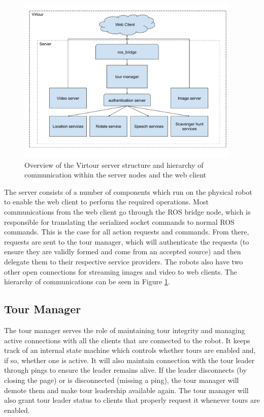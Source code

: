 \documentclass[
  oneside,
  11pt, a4paper,
  footinclude=true,
  headinclude=true,
  cleardoublepage=empty
]{article}
\begin{document}
\begin{figure}
  \centering
  \includegraphics[width=0.95\textwidth]{virtour_server}
  \caption{Overview of the Virtour server structure and hierarchy of
  communication within the server nodes and the web client}
  \label{fig:server}
\end{figure}

The server consists of a number of components which run on the physical robot
to enable the web client to perform the required operations. Most communications
from the web client go through the ROS bridge node, which is responsible
for translating the serialized socket commands to normal ROS commands. This is
the case for all action requests and commands. From there, requests are
sent to the tour manager, which will authenticate the requests (to ensure they
are validly formed and come from an accepted source) and then delegate them to
their respective service providers. The robots also have two other open
connections for streaming images and video to web clients. The hierarchy of
communications can be seen in Figure \ref{fig:server}.

\subsection{Tour Manager}

The tour manager serves the role of maintaining tour integrity and managing
active connections with all the clients that are connected to the robot. It
keeps track of an internal state machine which controls whether tours are
enabled and, if so, whether one is active. It will also maintain connection
with the tour leader through pings to ensure the leader remains alive. If the
leader disconnects (by closing the page) or is disconnected (missing a ping),
the tour manager will demote them and make tour leadership available again. The
tour manager will also grant tour leader status to clients that properly
request it whenever tours are enabled.
\end{document}
